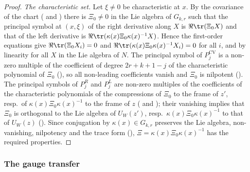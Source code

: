 \begin{proof}
\emph{The characteristic set.} Let $\xi\ne0$ be characteristic at $x$. By the covariance of the chart
( and )
there is $\Xi_0\ne0$ in the Lie algebra of $G_{k,r}$ such that the principal symbol at $(x,\xi)$ of the right derivative along
$X$ is $\Re\tr(\Xi_0X)$ and that of the left derivative is $\Re\tr(\kappa(x)\Xi_0\kappa(x)^{-1}X)$. Hence the first-order
equations give $\Re\tr(\Xi_0X_i)=0$ and $\Re\tr(\kappa(x)\Xi_0\kappa(x)^{-1}X_i)=0$ for all $i$, and by linearity for all $X$
in the Lie algebra of $N$. The principal symbol of $P^{\mathrm{CV}}_j$ is a non-zero multiple of the coefficient of degree
$2r+k+1-j$ of the characteristic polynomial of $\Xi_0$ (),
so all non-leading coefficients vanish and $\Xi_0$ is nilpotent
(). The principal symbols of
$P^R_j$ and $P^L_j$ are non-zero multiples of the coefficients of the characteristic polynomials of the compressions of $\Xi_0$
to the frame of $z'$, resp.\ of $\kappa(x)\Xi_0\kappa(x)^{-1}$ to the frame of $z$
( and );
their vanishing implies that $\Xi_0$ is orthogonal to the Lie algebra of $U_W(z')$, resp.\ $\kappa(x)\Xi_0\kappa(x)^{-1}$ to
that of $U_W(z)$ (). Since
conjugation by $\kappa(x)\in G_{k,r}$ preserves the Lie algebra, non-vanishing, nilpotency and the trace form
(),
$\Xi=\kappa(x)\Xi_0\kappa(x)^{-1}$ has the required properties.
\end{proof}

\subsubsection{The gauge transfer}

